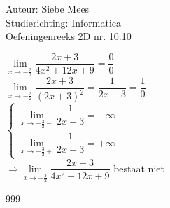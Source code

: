 \documentclass[a4paper]{article}
\begin{document}
  
\noindent \large Auteur: Siebe Mees \\
\noindent \large Studierichting: Informatica\\
\noindent \large Oefeningenreeks 2D nr. 10.10\\

\medskip

\normalsize

$\lim\limits_{x \rightarrow -\tfrac{3}{2}} \dfrac{2x+3}{4x^2+12x+9} = \dfrac{0}{0} $\\ 

$\lim\limits_{x \rightarrow -\tfrac{3}{2}} \dfrac{2x+3}{(2x+3)^2} = \dfrac{1}{2x+3} = \dfrac{1}{0}  $\\ 

$ \left \{
\begin{array}{l}
\lim\limits_{x \rightarrow -\tfrac{3}{2}-} \dfrac{1}{2x+3} = -\infty \\
\lim\limits_{x \rightarrow -\tfrac{3}{2}+} \dfrac{1}{2x+3} = +\infty
\end{array}
\right .$\\

$ \Rightarrow \lim\limits_{x \rightarrow -\tfrac{3}{2}} \dfrac{2x+3}{4x^2+12x+9}$ bestaat niet

\begin{thebibliography}{999}
\end{thebibliography}
\end{document}
